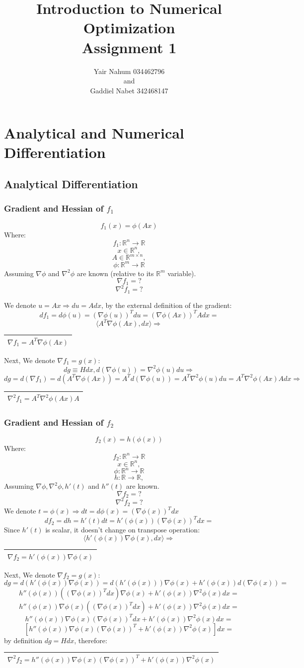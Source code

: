 \documentclass[12pt]{article}
\title{Introduction to Numerical Optimization\\Assignment 1}
\author{Yair Nahum 034462796\\and\\Gaddiel Nabet 342468147  }
\newcommand{\rectres}[1]{
\begin{center}
\begin{tabular}{ |c| }
\hline
 #1\\
\hline
\end{tabular}
\end{center}
}
\begin{document}
\maketitle


\section{Analytical and Numerical Differentiation}

\subsection{Analytical Differentiation}

\subsubsection{Gradient and Hessian of $f_1$}
$$f_1(x)=\phi(Ax)$$
Where:
$$f_1:\mathbb{R}^n \rightarrow \mathbb{R}$$
$$x \in \mathbb{R}^{n},$$
$$A \in \mathbb{R}^{m\times n},$$
$$\phi:\mathbb{R}^m \rightarrow \mathbb{R}$$
Assuming $\nabla\phi$ and $\nabla^2\phi$ are known (relative to its $\mathbb{R}^m$ variable).
$$\nabla f_1 = ?$$
$$\nabla^2 f_1 = ?$$

We denote $u=Ax \Rightarrow du=Adx$, by the external definition of the gradient:
$$df_1=d\phi(u)=(\nabla\phi(u))^T du = (\nabla\phi(Ax))^T A dx = $$
$$ \langle A^T\nabla \phi(Ax), dx \rangle \Rightarrow $$
\rectres{$\nabla f_1 = A^T\nabla \phi(Ax)$}
Next, We denote $\nabla f_1= g(x)$:
$$dg\equiv Hdx,d(\nabla \phi(u)) =  \nabla^2 \phi(u) du \Rightarrow$$
$$dg=d(\nabla f_1) = d(A^T\nabla \phi(Ax))=A^Td(\nabla \phi(u))=A^T\nabla^2 \phi(u) du = A^T\nabla^2 \phi(Ax) A dx \Rightarrow$$
\rectres{$\nabla^2 f_1 = A^T\nabla^2 \phi(Ax) A$}

\subsubsection{Gradient and Hessian of $f_2$}
$$f_2(x)=h(\phi(x))$$
Where:
$$f_2:\mathbb{R}^n \rightarrow \mathbb{R}$$
$$x \in \mathbb{R}^{n},$$
$$\phi:\mathbb{R}^n \rightarrow \mathbb{R}$$
$$h:\mathbb{R} \rightarrow \mathbb{R},$$
Assuming $\nabla\phi, \nabla^2\phi, h'(t)$ and $h''(t)$ are known.
$$\nabla f_2 = ?$$
$$\nabla^2 f_2 = ?$$
We denote $t=\phi(x)\Rightarrow dt=d\phi(x)=(\nabla \phi(x))^Tdx$
$$df_2= dh = h'(t)dt = h'(\phi(x))(\nabla \phi(x))^Tdx=$$
Since $h'(t)$ is scalar, it doesn't change on transpose operation:
$$\langle h'(\phi(x))\nabla \phi(x), dx \rangle \Rightarrow$$
\rectres{$\nabla f_2 = h'(\phi(x))\nabla \phi(x)$}
Next, We denote $\nabla f_2= g(x)$:
$$dg = d(h'(\phi(x))\nabla \phi(x)) =  d(h'(\phi(x)))\nabla \phi(x) + h'(\phi(x))d(\nabla \phi(x))=$$
$$h''(\phi(x))((\nabla \phi(x))^Tdx)\nabla \phi(x) + h'(\phi(x))\nabla^2 \phi(x)dx=$$
$$h''(\phi(x))\nabla \phi(x)((\nabla \phi(x))^Tdx) + h'(\phi(x))\nabla^2 \phi(x)dx=$$
$$h''(\phi(x))\nabla \phi(x)(\nabla \phi(x))^Tdx + h'(\phi(x))\nabla^2 \phi(x)dx=$$
$$[h''(\phi(x))\nabla \phi(x)(\nabla \phi(x))^T + h'(\phi(x))\nabla^2 \phi(x)]dx=$$
by definition $dg=Hdx$, therefore:
\rectres{$\nabla^2 f_2 = h''(\phi(x))\nabla \phi(x)(\nabla \phi(x))^T + h'(\phi(x))\nabla^2 \phi(x)$}
\newpage
\end{document}

